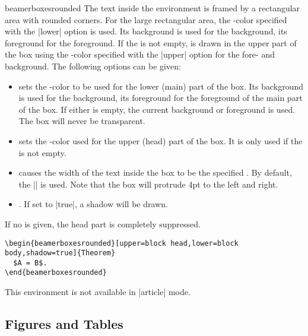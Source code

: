 \begin{environment}{{beamerboxesrounded}}
  The text inside the environment is framed by a rectangular area with
  rounded corners. For the large rectangular area, the \beamer-color
  specified with the |lower| option  is used. Its background is used
  for the background, its foreground for the foreground. If the
   is not empty,  is drawn in the 
  upper part of the box using the \beamer-color specified with the
  |upper| option for the fore- and background. The following options
  can be given: 
  \begin{itemize}
  \item {} sets the \beamer-color
    to be used for the lower (main) part of the box. Its background is
    used for the background, its foreground for the foreground of the
    main part of the box. If either is empty, the current background
    or foreground is used. The box will never be transparent.
  \item {} sets the \beamer-color
    used for the upper (head) part of the box. It is only used if the
     is not empty.     
  \item {} causes the width of the
    text inside the box to be the specified . By
    default, the |\textwidth| is used. Note that the box will protrude
    4pt to the left and right.
  \item {}. If set to |true|, a
    shadow will be drawn.    
  \end{itemize}
  If no  is given, the head part is completely suppressed.
  \example
\begin{verbatim}
\begin{beamerboxesrounded}[upper=block head,lower=block body,shadow=true]{Theorem}
  $A = B$.
\end{beamerboxesrounded}
\end{verbatim}

  \articlenote
  This environment is not available in |article| mode.
\end{environment}





\subsection{Figures and Tables}


